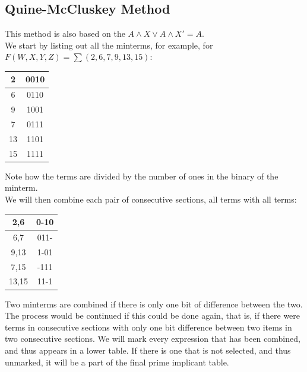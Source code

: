 \documentclass[nobib]{tufte-handout}
\begin{document}
    \subsection{Quine-McCluskey Method}
    This method is also based on the $A\land X \lor A\land X' = A$.\\ We start by
    listing out all the minterms, for example, for $F(W,X,Y,Z) = \sum
(2,6,7,9,13,15)$:\\
\begin{table}
    \centering
    \begin{tabular}{c c}
        2  & 0010 \\
        \hline
        6  & 0110 \\
        9  & 1001 \\
        \hline
        7  & 0111 \\
        13 & 1101 \\
        \hline
        15 & 1111
    \end{tabular}
\end{table}
Note how the terms are divided by the number of ones in the binary of the minterm.\\
We will then combine each pair of consecutive sections, all terms with all terms:\\
\begin{table}
    \centering
    \begin{tabular}{c c}
        2,6   & 0-10 \\
        \hline
        6,7   & 011- \\
        9,13  & 1-01 \\
        \hline
        7,15  & -111 \\
        13,15 & 11-1 \\
    \end{tabular}
\end{table}
Two minterms are combined if there is only one bit of difference between the two. The process would be continued if this could be done again, that is, if there were terms in consecutive sections with only one bit difference between two items in two consecutive sections. We will mark every expression that has been combined, and thus appears in a lower table. If there is one that is not selected, and thus unmarked, it will be a part of the final prime implicant table.\\
\end{document}
